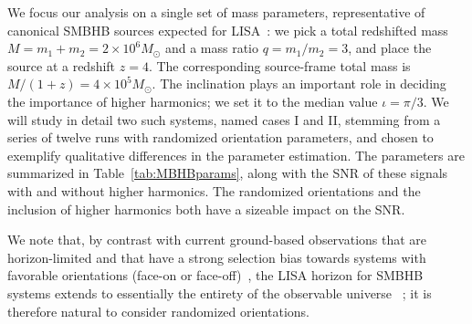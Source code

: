 \documentclass[aps,showpacs,twocolumn,prd,superscriptaddress,nofootinbib]{revtex4-1}
\begin{document}
We focus our analysis on a single set of mass parameters, representative of canonical SMBHB sources expected for LISA~\cite{Barausse12, Klein+15, LISA2017}: we pick a total redshifted mass $M=m_{1}+m_{2} = 2\times10^{6} M_{\odot}$ and a mass ratio $q=m_{1}/m_{2} = 3$, and place the source at a redshift $z=4$. The corresponding source-frame total mass is $M/(1+z) = 4\times10^{5} M_{\odot}$. The inclination plays an important role in deciding the importance of higher harmonics; we set it to the median value $\iota = \pi/3$. We will study in detail two such systems, named cases I and II, stemming from a series of twelve runs with randomized orientation parameters, and chosen to exemplify qualitative differences in the parameter estimation. The parameters are summarized in Table~\ref{tab:MBHBparams}, along with the SNR of these signals with and without higher harmonics. The randomized orientations and the inclusion of higher harmonics both have a sizeable impact on the SNR.

We note that, by contrast with current ground-based observations that are horizon-limited and that have a strong selection bias towards systems with favorable orientations (face-on or face-off)~\cite{}, the LISA horizon for SMBHB systems extends to essentially the entirety of the observable universe~\cite{LISA2017} \cite{}; it is therefore natural to consider randomized orientations.
\end{document}
